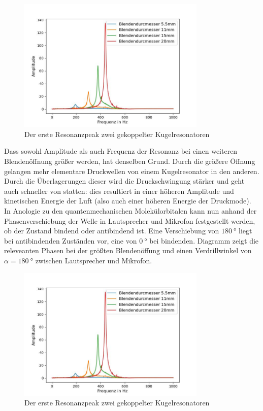 \documentclass[../main.tex]{subfiles}
\begin{document}
        \begin{figure}[H]
            \centering
            \includegraphics[width=0.8\textwidth]{Bilddateien/Auswertung/IV_a_Spektren.jpg}
            \caption{Der erste Resonanzpeak zwei gekoppelter Kugelresonatoren }
            \label{fig:IV_a_Spektren}
        \end{figure}

        Dass sowohl Amplitude als auch Frequenz der Resonanz bei einen weiteren Blendenöffnung größer werden, hat denselben Grund. Durch die größere Öffnung gelangen mehr elementare Druckwellen von einem Kugelresonator in den anderen. Durch die Überlagerungen dieser wird die Druckschwingung stärker und geht auch schneller von statten: dies resultiert in einer höheren Amplitude und kinetischen Energie der Luft (also auch einer höheren Energie der Druckmode).\\
        
        In Anologie zu den quantenmechanischen Molekülorbitalen kann nun anhand der Phasenverschiebung der Welle in Lautsprecher und Mikrofon festgestellt werden, ob der Zustand bindend oder antibindend ist. Eine Verschiebung von $\SI{180}{\degree}$ liegt bei antibindenden 
        Zuständen vor, eine von $\SI{0}{\degree}$ bei bindenden. Diagramm zeigt die releveanten Phasen bei der größten Blendenöffung und einen Verdrillwinkel von $\alpha=\SI{180}{\degree}$ zwischen Lautsprecher und Mikrofon.

        \begin{figure}[H]
            \centering
            \includegraphics[width=0.8\textwidth]{Bilddateien/Auswertung/IV_a_Spektren.jpg}
            \caption{Der erste Resonanzpeak zwei gekoppelter Kugelresonatoren }
            \label{fig:IV_a_Spektren}
        \end{figure}
\end{document}
